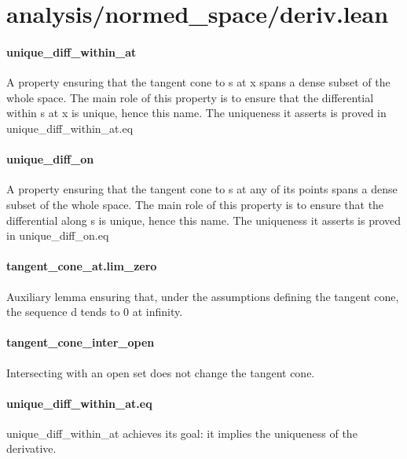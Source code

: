 \documentclass{article}
\begin{document}
\section{analysis/normed\_space/deriv.lean}\paragraph{unique\_diff\_within\_at}
\par
A property ensuring that the tangent cone to 
\colorbox[RGB]{253,246,227}{{{{\color[RGB]{101, 123, 131} s }}}} at 
\colorbox[RGB]{253,246,227}{{{{\color[RGB]{101, 123, 131} x }}}} spans a dense subset of the whole space.
The main role of this property is to ensure that the differential within 
\colorbox[RGB]{253,246,227}{{{{\color[RGB]{101, 123, 131} s }}}} at 
\colorbox[RGB]{253,246,227}{{{{\color[RGB]{101, 123, 131} x }}}} is unique,
hence this name. The uniqueness it asserts is proved in 
\colorbox[RGB]{253,246,227}{{{{\color[RGB]{101, 123, 131} unique\_diff\_within\_at.eq }}}}\paragraph{unique\_diff\_on}
\par
A property ensuring that the tangent cone to 
\colorbox[RGB]{253,246,227}{{{{\color[RGB]{101, 123, 131} s }}}} at any of its points spans a dense subset of
the whole space.  The main role of this property is to ensure that the differential along 
\colorbox[RGB]{253,246,227}{{{{\color[RGB]{101, 123, 131} s }}}} is
unique, hence this name. The uniqueness it asserts is proved in 
\colorbox[RGB]{253,246,227}{{{{\color[RGB]{101, 123, 131} unique\_diff\_on.eq }}}}\paragraph{tangent\_cone\_at.lim\_zero}
\par
Auxiliary lemma ensuring that, under the assumptions defining the tangent cone,
the sequence 
\colorbox[RGB]{253,246,227}{{{{\color[RGB]{101, 123, 131} d }}}} tends to 0 at infinity.
\paragraph{tangent\_cone\_inter\_open}
\par
Intersecting with an open set does not change the tangent cone.
\paragraph{unique\_diff\_within\_at.eq}
\par
\colorbox[RGB]{253,246,227}{{{{\color[RGB]{101, 123, 131} unique\_diff\_within\_at }}}} achieves its goal: it implies the uniqueness of the derivative.
\end{document}
